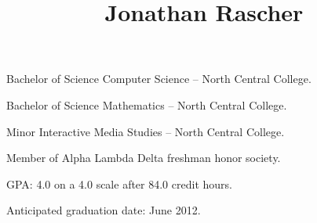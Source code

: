 \documentclass[11pt]{simplecv}
\begin{document}
  \leftheader{
    \contactemail \\
    \contactphone
  }

  \rightheader{
    \contactaddressone \\
    \contactaddresstwo
  }

  \title{Jonathan Rascher}
  \maketitle

  \begin{topic}
    \item[Bachelor of Science] Computer Science -- North Central College.

    \item[Bachelor of Science] Mathematics -- North Central College.

    \item[Minor] Interactive Media Studies -- North Central College.

    \item Member of Alpha Lambda Delta freshman honor society.

    \item GPA: 4.0 on a 4.0 scale after 84.0 credit hours.

    \item Anticipated graduation date: June 2012.
  \end{topic}
\end{document}
